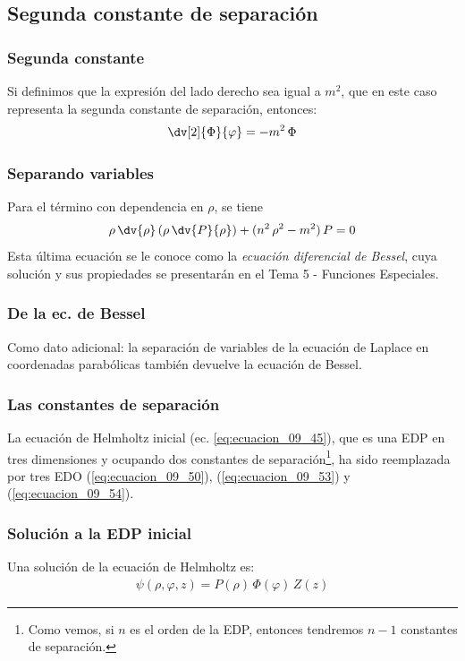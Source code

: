 \subsection{Segunda constante de separación}
\begin{frame}
\frametitle{Segunda constante}
Si definimos que la expresión del lado derecho sea igual a $m^{2}$, que en este caso representa la segunda constante de separación, entonces:
\begin{align}
\dv[2]{\Phi}{\varphi} = - m^{2} \, \Phi
\label{eq:ecuacion_09_53}
\end{align}
\end{frame}
\begin{frame}
\frametitle{Separando variables}
Para el término con dependencia en $\rho$, se tiene
\begin{align}
\rho \, \dv{\rho} \left( \rho \, \dv{P}{\rho} \right) + (n^{2} \, \rho^{2} - m^{2}) \, P = 0
\label{eq:ecuacion_09_54}
\end{align}
\pause
Esta última ecuación se le conoce como la \emph{ecuación diferencial de Bessel}, cuya solución y sus propiedades se presentarán en el Tema 5 - Funciones Especiales. 
\end{frame}
\begin{frame}
\frametitle{De la ec. de Bessel}
Como dato adicional: la separación de variables de la ecuación de Laplace en coordenadas parabólicas también devuelve la ecuación de Bessel.
\end{frame}
\begin{frame}
\frametitle{Las constantes de separación}
La ecuación de Helmholtz inicial (ec. \ref{eq:ecuacion_09_45}), que es una EDP en tres dimensiones y ocupando dos constantes de separación\footnote{Como vemos, si $n$ es el orden de la EDP, entonces tendremos $n-1$ constantes de separación.}, ha sido reemplazada por tres EDO (\ref{eq:ecuacion_09_50}), (\ref{eq:ecuacion_09_53}) y (\ref{eq:ecuacion_09_54}).
\end{frame}
\begin{frame}
\frametitle{Solución a la EDP inicial}
Una solución de la ecuación de Helmholtz es:
\begin{align}
\psi (\rho, \varphi, z) = P(\rho) \, \Phi (\varphi) \, Z(z)
\label{eq:ecuacion_09_55}    
\end{align}
\end{frame}
